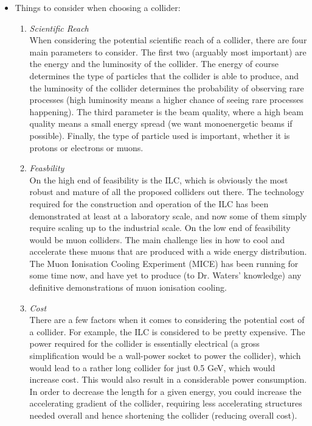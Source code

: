 \begin{itemize}
\item Things to consider when choosing a collider:

\begin{enumerate}
\item \emph{Scientific Reach}\\
When considering the potential scientific reach of a collider, there are four main parameters to consider. The first two (arguably most important) are the energy and the luminosity of the collider. The energy of course determines the type of particles that the collider is able to produce, and the luminosity of the collider determines the probability of observing rare processes (high luminosity means a higher chance of seeing rare processes happening). The third parameter is the beam quality, where a high beam quality means a small energy spread (we want monoenergetic beams if possible). Finally, the type of particle used is important, whether it is protons or electrons or muons.

\item \emph{Feasbility}\\
On the high end of feasibility is the ILC, which is obviously the most robust and mature of all the proposed colliders out there. The technology required for the construction and operation of the ILC has been demonstrated at least at a laboratory scale, and now some of them simply require scaling up to the industrial scale. On the low end of feasibility would be muon colliders. The main challenge lies in how to cool and accelerate these muons that are produced with a wide energy distribution. The Muon Ionisation Cooling Experiment (MICE) has been running for some time now, and have yet to produce (to Dr. Waters' knowledge) any definitive demonstrations of muon ionisation cooling.

\item \emph{Cost}\\
There are a few factors when it comes to considering the potential cost of a collider. For example, the ILC is considered to be pretty expensive. The power required for the collider is essentially electrical (a gross simplification would be a wall-power socket to power the collider), which would lead to a rather long collider for just 0.5 GeV, which would increase cost. This would also result in a considerable power consumption. In order to decrease the length for a given energy, you could increase the accelerating gradient of the collider, requiring less accelerating structures needed overall and hence shortening the collider (reducing overall cost).
\end{enumerate}


\end{itemize}
